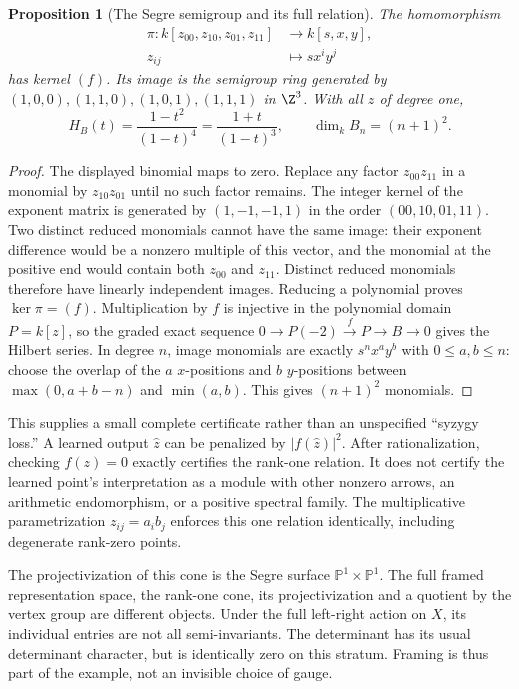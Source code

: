 \documentclass[11pt,oneside,openany]{book}
\newtheorem{proposition}[theorem]{Proposition}
\theoremstyle{definition}\newtheorem{definition}[theorem]{Definition}
\theoremstyle{remark}\newtheorem{remark}[theorem]{Remark}
\begin{document}
\begin{proposition}[The Segre semigroup and its full relation]\label{tg:segre}
The homomorphism
\[
 \begin{split}
 \pi:k[z_{00},z_{10},z_{01},z_{11}]&\longrightarrow k[s,x,y],\\
 z_{ij}&\longmapsto sx^iy^j
 \end{split}
\]
has kernel $(f)$. Its image is the semigroup ring generated by
$(1,0,0),(1,1,0),(1,0,1),(1,1,1)$ in $\Z^3$.
With all $z$ of degree one,
\[
 H_B(t)=\frac{1-t^2}{(1-t)^4}
       =\frac{1+t}{(1-t)^3},\qquad \dim_kB_n=(n+1)^2.
\]
\end{proposition}
\begin{proof}
The displayed binomial maps to zero. Replace any factor $z_{00}z_{11}$
in a monomial by $z_{10}z_{01}$ until no such factor remains. The integer
kernel of the exponent matrix is generated by $(1,-1,-1,1)$ in the
order $(00,10,01,11)$. Two distinct reduced monomials cannot have the same
image: their exponent difference would be a nonzero multiple of this
vector, and the monomial at the positive end would contain both
$z_{00}$ and $z_{11}$. Distinct reduced monomials therefore have linearly
independent images. Reducing a polynomial proves $\ker\pi=(f)$.
Multiplication by $f$ is injective in the polynomial domain $P=k[z]$,
so the graded exact sequence
$0\to P(-2)\xrightarrow{f}P\to B\to0$ gives the Hilbert series.
In degree $n$, image monomials are exactly $s^nx^ay^b$ with
$0\leq a,b\leq n$: choose the overlap of the $a$ $x$-positions and
$b$ $y$-positions between $\max(0,a+b-n)$ and $\min(a,b)$.
This gives $(n+1)^2$ monomials.
\end{proof}

This supplies a small complete certificate rather than an unspecified
``syzygy loss.'' A learned output $\widehat z$ can be penalized by
$|f(\widehat z)|^2$. After rationalization, checking $f(z)=0$ exactly
certifies the rank-one relation. It does not certify the learned point's
interpretation as a module with other nonzero arrows, an arithmetic
endomorphism, or a positive spectral family. The multiplicative
parametrization $z_{ij}=a_i b_j$ enforces this one relation identically,
including degenerate rank-zero points.

The projectivization of this cone is the Segre surface
$\mathbb P^1\times\mathbb P^1$. The full framed representation space,
the rank-one cone, its projectivization and a quotient by the vertex group
are different objects. Under the full left-right action on $X$, its
individual entries are not all semi-invariants. The determinant has its
usual determinant character, but is identically zero on this stratum.
Framing is thus part of the example, not an invisible choice of gauge.
\end{document}
